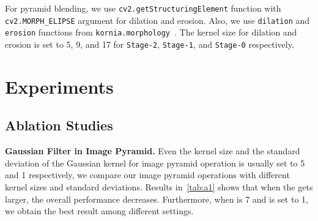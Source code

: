 \documentclass{llncs}
\begin{document}
    For pyramid blending, we use \texttt{cv2.getStructuringElement} function with \texttt{cv2.MORPH\_ELIPSE} argument for dilation and erosion.
    Also, we use \texttt{dilation} and \texttt{erosion} functions from \texttt{kornia.morphology}~\cite{riba2020kornia}.
    The kernel size for dilation and erosion is set to 5, 9, and 17 for \texttt{Stage-2}, \texttt{Stage-1}, and \texttt{Stage-0} respectively.
 
\section{Experiments}

\subsection{Ablation Studies}
\noindent
\textbf{Gaussian Filter in Image Pyramid.} Even the kernel size  and the standard deviation  of the Gaussian kernel  for image pyramid operation is usually set to 5 and 1 respectively, 
we compare our image pyramid operations with different kernel sizes and standard deviations. 
Results in~\cref{tab:a1} shows that when the  gets larger, the overall performance decreases. 
Furthermore, when  is 7 and  is set to 1, we obtain the best result among different settings.
\end{document}
